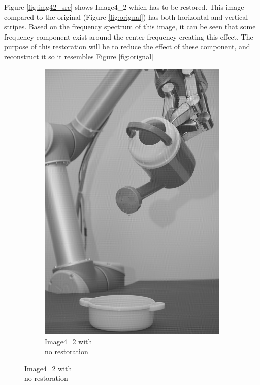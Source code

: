 Figure \ref{fig:img42_src} shows  Image4\_2 which has to be restored. This image  compared to the original  (Figure \ref{fig:orignal}) has  both horizontal and vertical stripes.   Based on the frequency spectrum of this image, it can be seen that some frequency component exist around the center frequency creating this effect. The purpose of this restoration will be to reduce the effect of these component, and reconstruct it so it resembles Figure \ref{fig:orignal}

\begin{figure}[H]
    \centering
    \begin{subfigure}[b]{0.23\textwidth}
        \includegraphics[width=\textwidth]{img4/Image4_2.png}
        \caption{Image4\_2 with \\no restoration}

\end{subfigure}
\end{figure}
